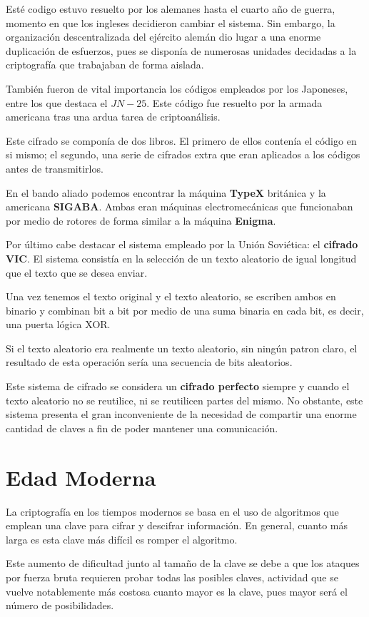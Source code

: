 \documentclass[nochap]{apuntesURJC}
\begin{document}
Esté codigo estuvo resuelto por los alemanes hasta el cuarto año de guerra, momento en que los ingleses decidieron cambiar el sistema. Sin embargo, la organización descentralizada del ejército alemán dio lugar a una enorme duplicación de esfuerzos, pues se disponía de numerosas unidades decidadas a la criptografía que trabajaban de forma aislada.

También fueron de vital importancia los códigos empleados por los Japoneses, entre los que destaca el $JN-25$. Este código fue resuelto por la armada americana tras una ardua tarea de criptoanálisis.

Este cifrado se componía de dos libros. El primero de ellos contenía el código en si mismo; el segundo, una serie de cifrados extra que eran aplicados a los códigos antes de transmitirlos.

En el bando aliado podemos encontrar la máquina \textbf{TypeX} británica y la americana \textbf{SIGABA}. Ambas eran máquinas electromecánicas que funcionaban por medio de rotores de forma similar a la máquina \textbf{Enigma}.

Por último cabe destacar el sistema empleado por la Unión Soviética: el \textbf{cifrado VIC}. El sistema consistía en la selección de un texto aleatorio de igual longitud que el texto que se desea enviar.

Una vez tenemos el texto original y el texto aleatorio, se escriben ambos en binario y combinan bit a bit por medio de una suma binaria en cada bit, es decir, una puerta lógica XOR.

Si el texto aleatorio era realmente un texto aleatorio, sin ningún patron claro, el resultado de esta operación sería una secuencia de bits aleatorios.

Este sistema de cifrado se considera un \textbf{cifrado perfecto} siempre y cuando el texto aleatorio no se reutilice, ni se reutilicen partes del mismo. No obstante, este sistema presenta el gran inconveniente de la necesidad de compartir una enorme cantidad de claves a fin de poder mantener una comunicación.

\section{Edad Moderna}
La criptografía en los tiempos modernos se basa en el uso de algoritmos que emplean una clave para cifrar y descifrar información. En general, cuanto más larga es esta clave más difícil es romper el algoritmo.

Este aumento de dificultad junto al tamaño de la clave se debe a que los ataques por fuerza bruta requieren probar todas las posibles claves, actividad que se vuelve notablemente más costosa cuanto mayor es la clave, pues mayor será el número de posibilidades.
\end{document}
